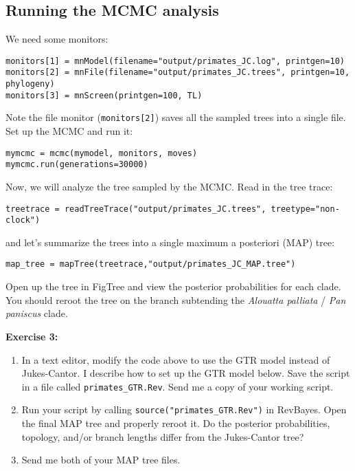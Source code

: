 \documentclass[11pt]{article}
\begin{document}
\subsection{Running the MCMC analysis}

We need some monitors:
\begin{verbatim}
monitors[1] = mnModel(filename="output/primates_JC.log", printgen=10)
monitors[2] = mnFile(filename="output/primates_JC.trees", printgen=10, phylogeny)
monitors[3] = mnScreen(printgen=100, TL)
\end{verbatim}
Note the file monitor (\texttt{monitors[2]}) saves all the sampled
trees into a single file.
Set up the MCMC and run it:
\begin{verbatim}
mymcmc = mcmc(mymodel, monitors, moves)
mymcmc.run(generations=30000)
\end{verbatim}
Now, we will analyze the tree sampled by the MCMC.
Read in the tree trace:
\begin{verbatim}
treetrace = readTreeTrace("output/primates_JC.trees", treetype="non-clock")
\end{verbatim}
and let's summarize the trees into a single
maximum a posteriori (MAP) tree:
\begin{verbatim}
map_tree = mapTree(treetrace,"output/primates_JC_MAP.tree")
\end{verbatim}
Open up the tree in FigTree and view the posterior probabilities
for each clade. You should reroot the tree on the branch
    subtending the \textit{Alouatta palliata} /
    \textit{Pan paniscus} clade.

\begin{framed}
\noindent
\textbf{Exercise 3:} \\
\begin{enumerate}
\item In a text editor, modify the code above to use the GTR model
    instead of Jukes-Cantor. I describe how to set up the GTR model below.
    Save the script in a file called \texttt{primates\_GTR.Rev}.
    Send me a copy of your working script.
\item Run your script by calling \texttt{source("primates\_GTR.Rev")}
      in RevBayes. Open the final MAP tree and properly reroot it.
      Do the posterior probabilities, topology, and/or branch lengths
      differ from the Jukes-Cantor tree?
\item Send me both of your MAP tree files.
\end{enumerate}
\end{framed}
\end{document}
